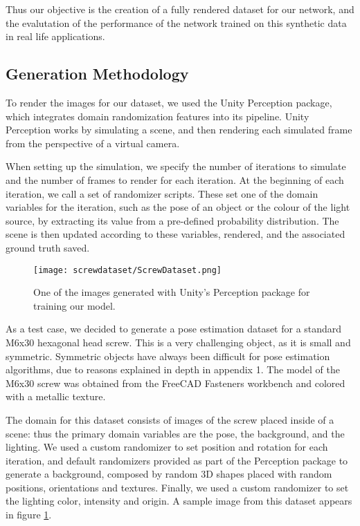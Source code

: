 Thus our objective is the creation of a fully rendered dataset for our network, and the evalutation of the performance of the network trained on this synthetic data in real life applications.

\subsection{Generation Methodology}
\label{ss:ScrewDataset}

To render the images for our dataset, we used the Unity Perception package\cite{unityPerception}, which integrates domain randomization features into its pipeline. Unity Perception works by simulating a scene, and then rendering each simulated frame from the perspective of a virtual camera. 

When setting up the simulation, we specify the number of iterations to simulate and the number of frames to render for each iteration. At the beginning of each iteration, we call a set of randomizer scripts. These set one of the domain variables for the iteration, such as the pose of an object or the colour of the light source, by extracting its value from a pre-defined probability distribution. The scene is then updated according to these variables, rendered, and the associated ground truth saved.

\begin{figure}
    \centering
    \texttt{[image: screwdataset/ScrewDataset.png]}
    \caption{One of the images generated with Unity's Perception package for training our model.}
    \label{fig:screwdataset}
\end{figure}

As a test case, we decided to generate a pose estimation dataset for a standard M6x30 hexagonal head screw. This is a very challenging object, as it is small and symmetric. Symmetric objects have always been difficult for pose estimation algorithms, due to reasons explained in depth in appendix 1. The model of the M6x30 screw was obtained from the FreeCAD Fasteners workbench\cite{Fasteners} and colored with a metallic texture.

The domain for this dataset consists of images of the screw placed inside of a scene: thus the primary domain variables are the pose, the background, and the lighting. We used a custom randomizer to set position and rotation for each iteration, and default randomizers provided as part of the Perception package to generate a background, composed by random 3D shapes placed with random positions, orientations and textures. Finally, we used a custom randomizer to set the lighting color, intensity and origin. A sample image from this dataset appears in figure \ref{fig:screwdataset}.

